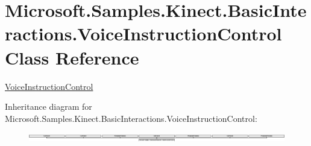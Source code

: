 \hypertarget{class_microsoft_1_1_samples_1_1_kinect_1_1_basic_interactions_1_1_voice_instruction_control}{\section{Microsoft.\-Samples.\-Kinect.\-Basic\-Interactions.\-Voice\-Instruction\-Control Class Reference}
\label{class_microsoft_1_1_samples_1_1_kinect_1_1_basic_interactions_1_1_voice_instruction_control}
}


\hyperlink{class_microsoft_1_1_samples_1_1_kinect_1_1_basic_interactions_1_1_voice_instruction_control}{Voice\-Instruction\-Control}  


Inheritance diagram for Microsoft.\-Samples.\-Kinect.\-Basic\-Interactions.\-Voice\-Instruction\-Control\-:\begin{figure}[H]
\begin{center}
\leavevmode
\includegraphics[height=0.401003cm]{class_microsoft_1_1_samples_1_1_kinect_1_1_basic_interactions_1_1_voice_instruction_control}
\end{center}
\end{figure}
